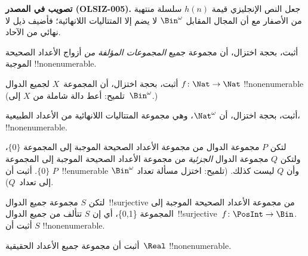 \documentclass[../../../include/open-logic-section]{subfiles}
\begin{document}
\begin{editorial}
\textbf{تصويب في المصدر (OLSIZ-005).}
جعل النص الإنجليزي قيمة $h(n)$ سلسلة منتهية من الأصفار مع أن المجال المقابل
$\Bin^\omega$ لا يضم إلا المتتاليات اللانهائية؛ فأضيف ذيل لا نهائي من الآحاد.
\end{editorial}

\begin{prob}
أثبت، بحجة اختزال، أن مجموعة جميع \emph{المجموعات المؤلفة من} أزواج الأعداد
الصحيحة الموجبة !!{nonenumerable}.
\end{prob}

\begin{prob}\label{sfr:siz:red:prob:nat-nat}
  أثبت، بحجة اختزال، أن المجموعة~$X$ لجميع الدوال
  $f\colon \Nat \to \Nat$ !!{nonenumerable} (تلميح: أعط دالة شاملة
  من $X$ إلى~$\Bin^\omega$.)
\end{prob}

\begin{prob}
أثبت، بحجة اختزال، أن $\Nat^\omega$، وهي مجموعة المتتاليات اللانهائية
من الأعداد الطبيعية، !!{nonenumerable}.
\end{prob}

\begin{prob}
لتكن $P$ مجموعة الدوال من مجموعة الأعداد الصحيحة الموجبة إلى المجموعة
$\{0\}$، ولتكن $Q$ مجموعة الدوال \emph{الجزئية} من مجموعة الأعداد
الصحيحة الموجبة إلى المجموعة $\{0\}$. أثبت أن $P$~!!{enumerable} وأن
$Q$ ليست كذلك. (تلميح: اختزل مسألة تعداد $\Bin^\omega$ إلى تعداد~$Q$).
\end{prob}

\begin{prob}
لتكن $S$ مجموعة جميع الدوال~!!{surjective} من مجموعة الأعداد الصحيحة
الموجبة إلى المجموعة \{0,1\}، أي إن $S$ تتألف من جميع
الدوال~!!{surjective}~$f\colon \PosInt \to \Bin$. أثبت أن $S$
!!{nonenumerable}.
\end{prob}

\begin{prob}
أثبت أن مجموعة جميع الأعداد الحقيقية~$\Real$ !!{nonenumerable}.
\end{prob}
\end{document}
